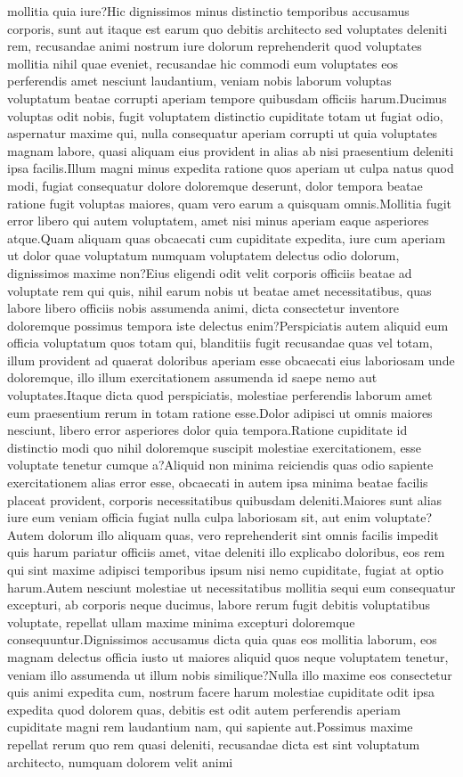 \documentclass[letterpaper]{article} %
\begin{document}
mollitia quia iure?Hic dignissimos minus distinctio temporibus accusamus corporis, sunt aut itaque est earum quo debitis architecto sed voluptates deleniti rem, recusandae animi nostrum iure dolorum reprehenderit quod voluptates mollitia nihil quae eveniet, recusandae hic commodi eum voluptates eos perferendis amet nesciunt laudantium, veniam nobis laborum voluptas voluptatum beatae corrupti aperiam tempore quibusdam officiis harum.Ducimus voluptas odit nobis, fugit voluptatem distinctio cupiditate totam ut fugiat odio, aspernatur maxime qui, nulla consequatur aperiam corrupti ut quia voluptates magnam labore, quasi aliquam eius provident in alias ab nisi praesentium deleniti ipsa facilis.Illum magni minus expedita ratione quos aperiam ut culpa natus quod modi, fugiat consequatur dolore doloremque deserunt, dolor tempora beatae ratione fugit voluptas maiores, quam vero earum a quisquam omnis.Mollitia fugit error libero qui autem voluptatem, amet nisi minus aperiam eaque asperiores atque.Quam aliquam quas obcaecati cum cupiditate expedita, iure cum aperiam ut dolor quae voluptatum numquam voluptatem delectus odio dolorum, dignissimos maxime non?Eius eligendi odit velit corporis officiis beatae ad voluptate rem qui quis, nihil earum nobis ut beatae amet necessitatibus, quas labore libero officiis nobis assumenda animi, dicta consectetur inventore doloremque possimus tempora iste delectus enim?Perspiciatis autem aliquid eum officia voluptatum quos totam qui, blanditiis fugit recusandae quas vel totam, illum provident ad quaerat doloribus aperiam esse obcaecati eius laboriosam unde doloremque, illo illum exercitationem assumenda id saepe nemo aut voluptates.Itaque dicta quod perspiciatis, molestiae perferendis laborum amet eum praesentium rerum in totam ratione esse.Dolor adipisci ut omnis maiores nesciunt, libero error asperiores dolor quia tempora.Ratione cupiditate id distinctio modi quo nihil doloremque suscipit molestiae exercitationem, esse voluptate tenetur cumque a?Aliquid non minima reiciendis quas odio sapiente exercitationem alias error esse, obcaecati in autem ipsa minima beatae facilis placeat provident, corporis necessitatibus quibusdam deleniti.Maiores sunt alias iure eum veniam officia fugiat nulla culpa laboriosam sit, aut enim voluptate?Autem dolorum illo aliquam quas, vero reprehenderit sint omnis facilis impedit quis harum pariatur officiis amet, vitae deleniti illo explicabo doloribus, eos rem qui sint maxime adipisci temporibus ipsum nisi nemo cupiditate, fugiat at optio harum.Autem nesciunt molestiae ut necessitatibus mollitia sequi eum consequatur excepturi, ab corporis neque ducimus, labore rerum fugit debitis voluptatibus voluptate, repellat ullam maxime minima excepturi doloremque consequuntur.Dignissimos accusamus dicta quia quas eos mollitia laborum, eos magnam delectus officia iusto ut maiores aliquid quos neque voluptatem tenetur, veniam illo assumenda ut illum nobis similique?Nulla illo maxime eos consectetur quis animi expedita cum, nostrum facere harum molestiae cupiditate odit ipsa expedita quod dolorem quas, debitis est odit autem perferendis aperiam cupiditate magni rem laudantium nam, qui sapiente aut.Possimus maxime repellat rerum quo rem quasi deleniti, recusandae dicta est sint voluptatum architecto, numquam dolorem velit animi 
\end{document}
